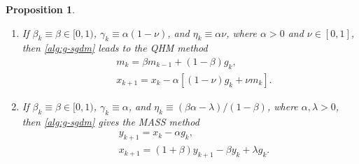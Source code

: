 \documentclass[10pt]{article}
\numberwithin{equation}{section}
\newtheorem{proposition}{Proposition}
\theoremstyle{definition}
\begin{document}
\begin{proposition}
\begin{enumerate}
\begin{equation}
            \begin{aligned}
                &y_{k+1} =x_k-\alpha g_k, \\
                &z_{k+1} = x_k - s \alpha g_k, \\
                &x_{k+1} =y_{k+1}+\beta(z_{k+1}-z_k).
            \end{aligned}
        \end{equation}
    \item[(\romannumeral4).] If $\beta_k\equiv\beta\in[0,1)$, $\gamma_k\equiv \alpha(1-\nu)$, and $\eta_k\equiv\alpha\nu$, where $\alpha>0$ and $\nu\in[0,1]$, then \eqref{alg:g-sgdm} leads to the QHM method
        \begin{equation}\label{alg:qhm}\tag{QHM}
        \begin{aligned}
        & m_k = \beta m_{k-1}+(1-\beta) g_k, \\
        & x_{k+1} = x_k-\alpha[(1-\nu) g_k+\nu m_k].
        \end{aligned}
        \end{equation}
    \item[(\romannumeral5).] If $\beta_k\equiv\beta\in[0,1)$, $\gamma_k\equiv \alpha$, and $\eta_k\equiv (\beta\alpha-\lambda)/(1-\beta)$, where $\alpha, \lambda>0$, then \eqref{alg:g-sgdm} gives the MASS method
        \begin{equation}\label{alg:mass}\tag{MASS}
            \begin{aligned}
            & y_{k+1} = x_k-\alpha g_k, \\
            & x_{k+1} = (1+\beta) y_{k+1}-\beta y_k+\lambda g_k.
            \end{aligned}
            \end{equation}
       \end{enumerate}
\end{proposition}
\end{document}
